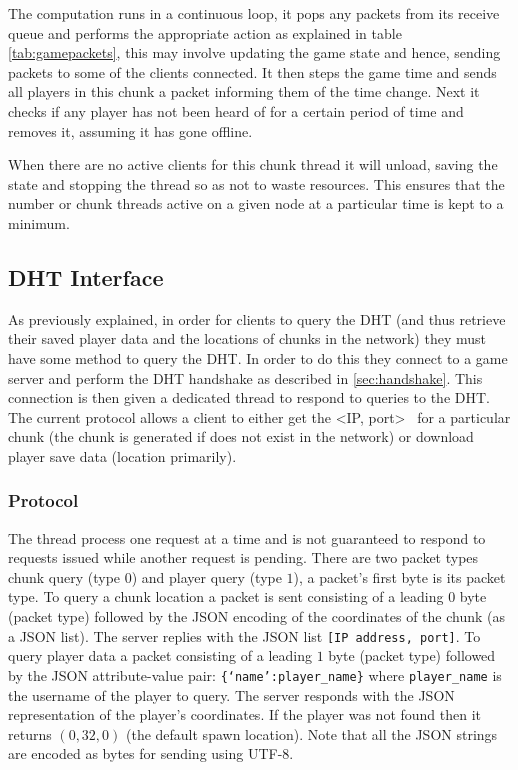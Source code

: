 \documentclass[12pt,notitlepage,a4paper]{report}
\begin{document}
	The computation runs in a continuous loop, it pops any packets from its receive queue and performs the appropriate action as explained in table \ref{tab:gamepackets}, this may involve updating the game state and hence, sending packets to some of the clients connected. It then steps the game time and sends all players in this chunk a packet informing them of the time change. Next it checks if any player has not been heard of for a certain period of time and removes it, assuming it has gone offline.
	
	When there are no active clients for this chunk thread it will unload, saving the state and stopping the thread so as not to waste resources. This ensures that the number or chunk threads active on a given node at a particular time is kept to a minimum.
	
	\subsection{DHT Interface}
	\label{sec:interface}
	As previously explained, in order for clients to query the DHT (and thus retrieve their saved player data and the locations of chunks in the network) they must have some method to query the DHT. In order to do this they connect to a game server and perform the DHT handshake as described in \cref{sec:handshake}. This connection is then given a dedicated thread to respond to queries to the DHT. The current protocol allows a client to either get the \textless IP, port\textgreater~ for a particular chunk (the chunk is generated if does not exist in the network) or download player save data (location primarily).
	
	\subsubsection{Protocol}
	The thread process one request at a time and is not guaranteed to respond to requests issued while another request is pending. There are two packet types chunk query (type $0$) and player query (type $1$), a packet's first byte is its packet type. To query a chunk location a packet is sent consisting of a leading $0$ byte (packet type) followed by the JSON encoding of the coordinates of the chunk (as a JSON list). The server replies with the JSON list \texttt{[IP address, port]}. To query player data a packet consisting of a leading $1$ byte (packet type) followed by the JSON attribute-value pair: \texttt{\{`name':player\_name\}} where \texttt{player\_name} is the username of the player to query. The server responds with the JSON representation of the player's coordinates. If the player was not found then it returns $(0,32,0)$ (the default spawn location). Note that all the JSON strings are encoded as bytes for sending using UTF-8.
	
\end{document}
